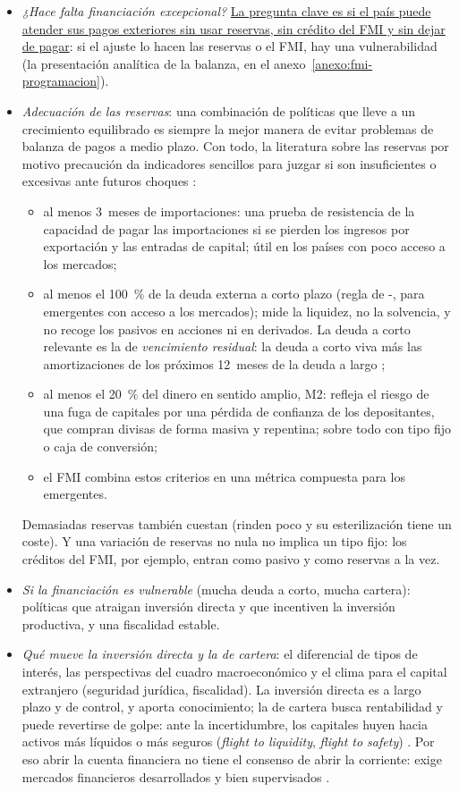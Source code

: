 \documentclass[11pt]{article}
\begin{document}
\begin{itemize}
\item \emph{¿Hace falta financiación excepcional?} \uline{La pregunta clave es si el país puede atender sus pagos exteriores sin usar reservas, sin crédito del FMI y sin dejar de pagar}: si el ajuste lo hacen las reservas o el FMI, hay una vulnerabilidad (la presentación analítica de la balanza, en el anexo~\ref{anexo:fmi-programacion}).
\item \emph{Adecuación de las reservas}: una combinación de políticas que lleve a un crecimiento equilibrado es siempre la mejor manera de evitar problemas de balanza de pagos a medio plazo. Con todo, la literatura sobre las reservas por motivo precaución da indicadores sencillos para juzgar si son insuficientes o excesivas ante futuros choques \parencite{FMI2011Reservas}:
  \begin{itemize}
  \item al menos 3~meses de importaciones: una prueba de resistencia de la capacidad de pagar las importaciones si se pierden los ingresos por exportación y las entradas de capital; útil en los países con poco acceso a los mercados;
  \item al menos el 100~\% de la deuda externa a corto plazo (regla de -, para emergentes con acceso a los mercados); mide la liquidez, no la solvencia, y no recoge los pasivos en acciones ni en derivados. La deuda a corto relevante es la de \emph{vencimiento residual}: la deuda a corto viva más las amortizaciones de los próximos 12~meses de la deuda a largo \parencite{FMI2014DeudaExterna};
  \item al menos el 20~\% del dinero en sentido amplio, M2: refleja el riesgo de una fuga de capitales por una pérdida de confianza de los depositantes, que compran divisas de forma masiva y repentina; sobre todo con tipo fijo o caja de conversión;
  \item el FMI combina estos criterios en una métrica compuesta para los emergentes.
  \end{itemize}
  Demasiadas reservas también cuestan (rinden poco y su esterilización tiene un coste). Y una variación de reservas no nula no implica un tipo fijo: los créditos del FMI, por ejemplo, entran como pasivo y como reservas a la vez.
\item \emph{Si la financiación es vulnerable} (mucha deuda a corto, mucha cartera): políticas que atraigan inversión directa y que incentiven la inversión productiva, y una fiscalidad estable.
\item \emph{Qué mueve la inversión directa y la de cartera}: el diferencial de tipos de interés, las perspectivas del cuadro macroeconómico y el clima para el capital extranjero (seguridad jurídica, fiscalidad). La inversión directa es a largo plazo y de control, y aporta conocimiento; la de cartera busca rentabilidad y puede revertirse de golpe: ante la incertidumbre, los capitales huyen hacia activos más líquidos o más seguros (\emph{flight to liquidity}, \emph{flight to safety}) \parencite{Calvo1998SuddenStops}. Por eso abrir la cuenta financiera no tiene el consenso de abrir la corriente: exige mercados financieros desarrollados y bien supervisados \parencite{FMI2012VisionInstitucional}.

\end{itemize}
\end{document}
